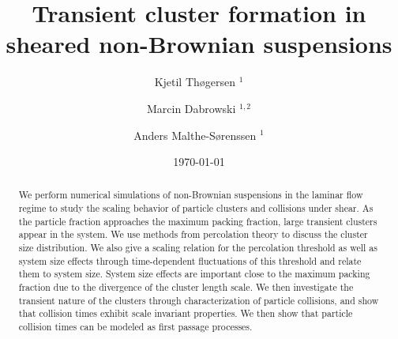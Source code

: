 \documentclass[aps,pre,twocolumn,letterpaper,floatfix,showpacs]{revtex4}
\begin{document}
\title{Transient cluster formation in sheared non-Brownian suspensions}
\author{Kjetil Th\o gersen $^1$}
\author{Marcin Dabrowski $^{1,2}$}
\author{Anders Malthe-S\o renssen $^1$}
\date{\today} 

\begin{abstract}
We perform numerical simulations of non-Brownian suspensions in the laminar flow regime to study the scaling behavior of particle clusters and collisions under shear. As the particle fraction approaches the maximum packing fraction, large transient clusters appear in the system. We use methods from percolation theory to discuss the cluster size distribution. We also give a scaling relation for the percolation threshold as well as system size effects through time-dependent fluctuations of this threshold and relate them to system size. System size effects are important close to the maximum packing fraction due to the divergence of the cluster length scale. We then investigate the transient nature of the clusters through characterization of particle collisions, and show that collision times exhibit scale invariant properties. We then show that particle collision times can be modeled as first passage processes.
\end{abstract}

\maketitle

\end{document}
